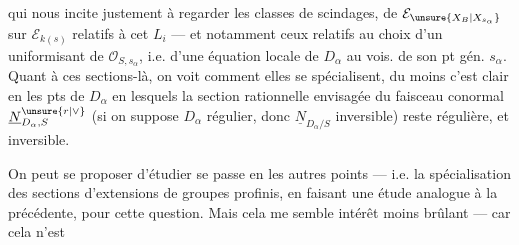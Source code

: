 qui nous incite justement à regarder les classes de scindages, de $\mathcal E_{\unsure{X_B|X_{s_\alpha}}}$ sur $\mathcal E_{k(s)}$ relatifs à cet $L_i$ --- et notamment ceux relatifs au choix d'un uniformisant de $\mathcal O_{S,s_\alpha}$, i.e. d'une équation locale de $D_\alpha$ au vois. de son pt gén. $s_\alpha$.   Quant à ces sections-là, on voit comment elles se spécialisent, du moins c'est clair en les pts de $D_\alpha$ en lesquels la section rationnelle envisagée du faisceau conormal $\underline N_{D_\alpha,S}^{\unsure{r|\vee}}$ (si on suppose $D_\alpha$ régulier,  donc $\underline N_{D_\alpha/S}$ inversible) reste régulière, et inversible.

On peut se proposer d'étudier   se passe en les autres points --- i.e. la spécialisation des sections  d'extensions de groupes profinis, en faisant une étude analogue à la précédente, pour cette question. Mais cela me semble   intérêt moins brûlant --- car cela n'est
